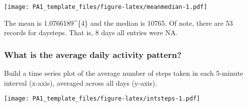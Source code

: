 \documentclass[]{article}
\newenvironment{Shaded}{\begin{snugshade}}{\end{snugshade}}
\newcommand{\KeywordTok}[1]{\textcolor[rgb]{0.13,0.29,0.53}{\textbf{#1}}}
\newcommand{\DataTypeTok}[1]{\textcolor[rgb]{0.13,0.29,0.53}{#1}}
\newcommand{\DecValTok}[1]{\textcolor[rgb]{0.00,0.00,0.81}{#1}}
\newcommand{\StringTok}[1]{\textcolor[rgb]{0.31,0.60,0.02}{#1}}
\newcommand{\OperatorTok}[1]{\textcolor[rgb]{0.81,0.36,0.00}{\textbf{#1}}}
\newcommand{\NormalTok}[1]{#1}
\begin{document}
\texttt{[image: PA1\_template\_files/figure-latex/meanmedian-1.pdf]}

\begin{Shaded}
\end{Shaded}

The mean is 1.0766189\^{}\{4\} and the median is 10765. Of
note, there are 53 records for daysteps. That is, 8 days all entries
were NA.

\subsubsection{What is the average daily activity
pattern?}\label{what-is-the-average-daily-activity-pattern}

Build a time series plot of the average number of steps taken in each
5-minute interval (x-axis), averaged across all days (y-axis).

\begin{Shaded}
\end{Shaded}

\texttt{[image: PA1\_template\_files/figure-latex/intsteps-1.pdf]}

\begin{Shaded}
\end{Shaded}
\end{document}
